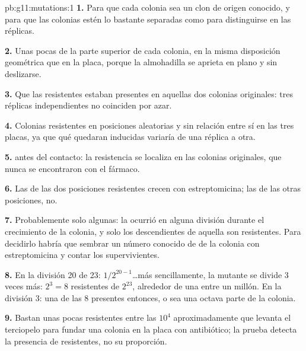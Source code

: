 \begin{solution}{pb:g11:mutations:1}
\textbf{1.} Para que cada colonia sea un clon de origen conocido, y
para que las colonias estén lo bastante separadas como para
distinguirse en las réplicas.

\textbf{2.} Unas pocas  de la parte superior de cada colonia, en
la misma disposición geométrica que en la placa, porque la almohadilla
se aprieta en plano y sin deslizarse.

\textbf{3.} Que las  resistentes estaban presentes en aquellas
dos colonias originales: tres réplicas independientes no coinciden por
azar.

\textbf{4.} Colonias resistentes en posiciones aleatorias y sin
relación entre sí en las tres placas, ya que qué  quedaran
inducidas variaría de una réplica a otra.

\textbf{5.}  antes del contacto: la resistencia se localiza en
las colonias originales, que nunca se encontraron con el fármaco.

\textbf{6.} Las  de las dos posiciones resistentes crecen con
estreptomicina; las de las otras posiciones, no.

\textbf{7.} Probablemente solo algunas: la  ocurrió en alguna
división durante el crecimiento de la colonia, y solo los
descendientes de aquella  son resistentes. Para decidirlo habría
que sembrar un número conocido de  de la colonia con
estreptomicina y contar los supervivientes.

\textbf{8.} En la división 20 de 23: $1/2^{20-1}$\dots más
sencillamente, la  mutante se divide 3 veces más: $2^3 = 8$
 resistentes de $2^{23}$, alrededor de una entre un millón. En
la división 3: una de las 8  presentes entonces, o sea una
octava parte de la colonia.

\textbf{9.} Bastan unas pocas  resistentes entre las $10^4$
aproximadamente que levanta el terciopelo para fundar una colonia en la
placa con antibiótico; la prueba detecta la presencia de 
resistentes, no su proporción.


\end{solution}
